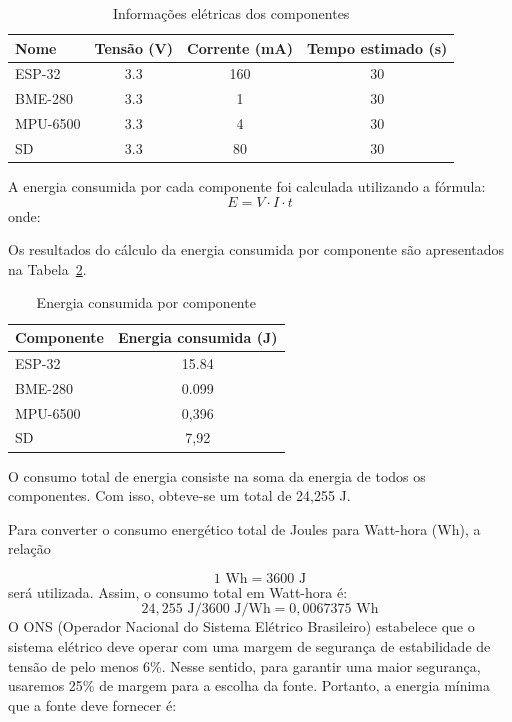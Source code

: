 \begin{table}[ht]
    \centering
    \caption{Informações elétricas dos componentes}
    \label{tab:componentes}
    \begin{tabular}{l c c c}
        \toprule
        Nome & Tensão (V) & Corrente (mA) & Tempo estimado (s) \\
        \midrule
        ESP-32 & 3.3 & 160 & 30 \\
        BME-280 & 3.3 & 1 & 30 \\
        MPU-6500 & 3.3 & 4 & 30 \\
        SD & 3.3 & 80 & 30 \\
        \bottomrule
    \end{tabular}
\end{table}



A energia consumida por cada componente foi calculada utilizando a fórmula:
\begin{equation}
E = V \cdot I \cdot t
\end{equation}
onde:

Os resultados do cálculo da energia consumida por componente são apresentados na Tabela~\ref{tab:energia_consumida}.

\begin{table}[ht]
    \centering
    \caption{Energia consumida por componente}
    \label{tab:energia_consumida}
    \begin{tabular}{l c}
        \toprule
        Componente & Energia consumida (J) \\
        \midrule
        ESP-32 & 15.84 \\
        BME-280 & 0.099 \\
        MPU-6500 & 0,396 \\
        SD & 7,92 \\
        \bottomrule
    \end{tabular}
\end{table}

O consumo total de energia consiste na soma da energia de todos os componentes. Com isso, obteve-se um total de 24,255 J.

Para converter o consumo energético total de Joules para Watt-hora (Wh), a relação

\begin{equation}
1 \text{ Wh} = 3600 \text{ J}
\end{equation}
será utilizada. Assim, o consumo total em Watt-hora é:
\begin{equation}
24,255 \text{ J} / 3600 \text{ J/Wh} = 0,0067375 \text{ Wh}
\end{equation}
O ONS (Operador Nacional do Sistema Elétrico Brasileiro) estabelece que o sistema elétrico deve operar com uma margem de segurança de estabilidade de tensão de pelo menos 6\%. Nesse sentido, para garantir uma maior segurança, usaremos 25\% de margem para a escolha da fonte. Portanto, a energia mínima que a fonte deve fornecer é:

